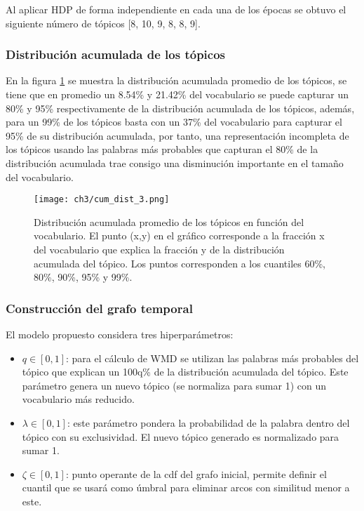 \documentclass[letterpaper,12pt,oneside]{book} %
\begin{document}
Al aplicar HDP de forma independiente en cada una de los épocas se obtuvo el siguiente número de tópicos [8, 10, 9, 8, 8, 9].

\subsubsection{Distribución acumulada de los tópicos}
En la figura \ref{img:cum_dist3} se muestra la distribución acumulada promedio de los tópicos, se tiene que en promedio un 8.54\% y 21.42\% del vocabulario se puede capturar un 80\% y 95\% respectivamente de la distribución acumulada de los tópicos, además, para un 99\% de los tópicos basta con un 37\% del vocabulario para capturar el 95\% de su distribución acumulada, por tanto, una representación incompleta de los tópicos usando las palabras más probables que capturan el 80\% de la distribución acumulada trae consigo una disminución importante en el tamaño del vocabulario. 

\begin{figure}
    \centering
    \texttt{[image: ch3/cum\_dist\_3.png]}
    \caption{Distribución acumulada promedio de los tópicos en función del vocabulario. El punto (x,y) en el gráfico corresponde a la fracción x del vocabulario que explica la fracción y de la distribución acumulada del tópico. Los puntos corresponden a los cuantiles 60\%, 80\%, 90\%, 95\% y 99\%.}
    \label{img:cum_dist3}
\end{figure}

\subsubsection{Construcción del grafo temporal}

El modelo propuesto considera tres hiperparámetros:
\begin{itemize}
    \item $q \in [0,1]$: para el cálculo de WMD se utilizan las palabras más probables del tópico que explican un 100q\% de la distribución acumulada del tópico. Este parámetro genera un nuevo tópico (se normaliza para sumar 1) con un vocabulario más reducido.
    \item $\lambda \in [0,1]$: este parámetro pondera la probabilidad de la palabra dentro del tópico con su exclusividad. El nuevo tópico generado es normalizado para sumar 1.
    \item $\zeta \in [0,1]$: punto operante de la cdf del grafo inicial, permite definir el cuantil que se usará como úmbral para eliminar arcos con similitud menor a este. 
\end{itemize}
\end{document}
